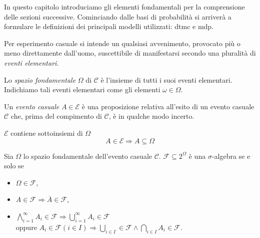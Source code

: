 In questo capitolo introduciamo gli elementi fondamentali per la comprensione delle sezioni successive. Cominciando dalle basi di probabilità si arriverà a formulare le definizioni dei principali modelli utilizzati: \ac{dtmc} e \ac{mdp}.

\begin{mtdef}
	Per esperimento casuale si intende un qualsiasi avvenimento, provocato più o meno direttamente dall'uomo, suscettibile di manifestarsi secondo una pluralità di \emph{eventi elementari}.
\end{mtdef}

\begin{mtdef}
	Lo \emph{spazio fondamentale} $\Omega$ di $\mathcal{C}$ è l'insieme di tutti i suoi eventi elementari. Indichiamo tali eventi elementari come gli elementi $\omega \in \Omega$.
\end{mtdef}

\begin{mtdef}
	Un \emph{evento casuale} $A \in \mathcal{E}$ è una proposizione relativa all'esito di un evento casuale $\mathcal{C}$ che, prima del compimento di $\mathcal{C}$, è in qualche modo incerto.
\end{mtdef}

\begin{mtobs}
	$\mathcal{E}$ contiene sottoinsiemi di $\Omega$
	$$ A \in \mathcal{E} \Rightarrow A \subseteq \Omega $$
\end{mtobs}

\begin{mtdef}
	Sia $\Omega$ lo spazio fondamentale dell'evento casuale $\mathcal{C}$. $\mathcal{F} \subseteq 2^\Omega$ è una $\sigma$-algebra se e solo se
	\begin{itemize}
		\item $\Omega \in \mathcal{F}$,
		\item $A \in \mathcal{F} \Rightarrow \overline{A} \in \mathcal{F}$,
		\item $\bigwedge_{i=1}^{\infty} A_i \in \mathcal{F} \Rightarrow \bigcup_{i=1}^\infty A_i \in \mathcal{F}$ \\ oppure $A_i \in \mathcal{F} (i \in I) \Rightarrow \bigcup_{i \in I} \in \mathcal{F} \wedge \bigcap_{i \in I} A_i \in \mathcal{F}$.
	\end{itemize}
\end{mtdef}

